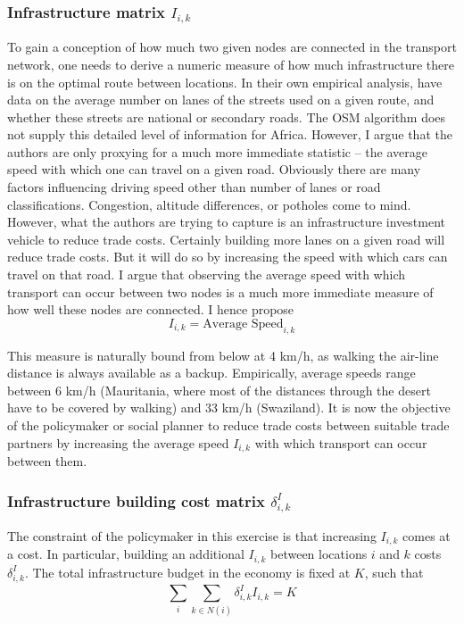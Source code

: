\documentclass[11pt, oneside]{article}   	%
\begin{document}
\subsubsection{Infrastructure matrix $I_{i,k}$}
To gain a conception of how much two given nodes are connected in the transport network, one needs to derive a numeric measure of how much infrastructure there is on the optimal route between locations. In their own empirical analysis, \cite{fajgelbaum_optimal_2017} have data on the average number on lanes of the streets used on a given route, and whether these streets are national or secondary roads. The OSM algorithm does not supply this detailed level of information for Africa. However, I argue that the authors are only proxying for a much more immediate statistic -- the average speed with which one can travel on a given road. Obviously there are many factors influencing driving speed other than number of lanes or road classifications. Congestion, altitude differences, or potholes come to mind. However, what the authors are trying to capture is an infrastructure investment vehicle to reduce trade costs. Certainly building more lanes on a given road will reduce trade costs. But it will do so by increasing the speed with which cars can travel on that road. I argue that observing the average speed with which transport can occur between two nodes is a much more immediate measure of how well these nodes are connected. I hence propose
\begin{equation}
  I_{i,k} = \textrm{Average Speed}_{i,k}
\end{equation}

This measure is naturally bound from below at 4 km/h, as walking the air-line distance is always available as a backup. Empirically, average speeds range between 6 km/h (Mauritania, where most of the distances through the desert have to be covered by walking) and 33 km/h (Swaziland). It is now the objective of the policymaker or social planner to reduce trade costs between suitable trade partners by increasing the average speed $I_{i,k}$ with which transport can occur between them.

\subsubsection{Infrastructure building cost matrix $\delta_{i,k}^{I}$}
The constraint of the policymaker in this exercise is that increasing $I_{i,k}$ comes at a cost. In particular, building an additional $I_{i,k}$ between locations $i$ and $k$ costs $\delta_{i,k}^{I}$. The total infrastructure budget in the economy is fixed at $K$, such that
\begin{equation}
  \sum_{i}^{}\sum_{k \in N(i)}^{} \delta_{i,k}^{I}I_{i,k} = K
  \label{eq:infr_building_constraint}
\end{equation}
\end{document}
